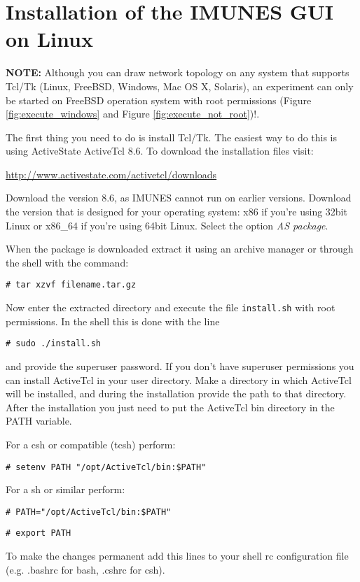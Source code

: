 \section{Installation of the IMUNES GUI on Linux}
\label{sec:installation on linux}
\textbf{NOTE:} Although you can draw network topology on any system that
supports Tcl/Tk (Linux, FreeBSD, Windows, Mac OS X, Solaris), an  experiment
can only be started on FreeBSD operation system with root permissions (Figure
\ref{fig:execute_windows} and Figure  \ref{fig:execute_not_root})!.

The first thing you need to do is install Tcl/Tk. The easiest way to do this is
using ActiveState ActiveTcl 8.6. To download the installation files visit:
\begin{center}
\url{http://www.activestate.com/activetcl/downloads}
\end{center}

Download the version 8.6, as IMUNES cannot run on earlier versions. Download
the version that is designed for your operating system: x86 if you're using
32bit Linux or x86\_64 if you're using 64bit Linux. Select the option \emph{AS
package}.

When the package is downloaded extract it using an archive manager or through
the shell with the command:

\texttt{\# tar xzvf filename.tar.gz}

Now enter the extracted directory and execute the file \texttt{install.sh} with
root permissions. In the shell this is done with the line

\texttt{\# sudo ./install.sh} 

and provide the superuser password. If you don't have superuser permissions you
can install ActiveTcl in your user directory. Make a directory in which
ActiveTcl will be installed, and during the installation provide the path to
that directory. After the installation you just need to put the ActiveTcl bin
directory in the PATH variable.

For a csh or compatible (tcsh) perform:

\texttt{\# setenv PATH "/opt/ActiveTcl/bin:\$PATH"}

For a sh or similar perform:

\texttt{\# PATH="/opt/ActiveTcl/bin:\$PATH"}

\texttt{\# export PATH}

To make the changes permanent add this lines to your shell rc configuration
file (e.g. .bashrc for bash, .cshrc for csh).

